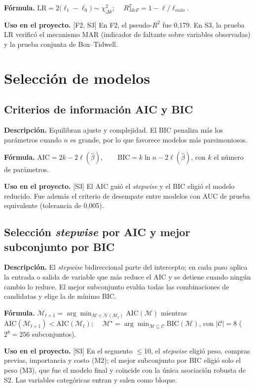 \documentclass[11pt,a4paper]{article}
\newcommand{\desc}{\textbf{Descripción.} }
\newcommand{\formula}{\textbf{Fórmula.} }
\newcommand{\uso}{\textbf{Uso en el proyecto.} }
\newcommand{\fase}[1]{{\footnotesize\color{gris}[#1]}}
\begin{document}
\formula $\mathrm{LR}=2\big(\ell_1-\ell_0\big)\sim\chi^2_{\Delta k}$; $\quad R^2_{McF}=1-\ell/\ell_{nulo}$.

\uso \fase{F2, S3} En F2, el pseudo-$R^2$ fue 0,179. En S3, la prueba LR verificó el mecanismo MAR (indicador de faltante sobre variables observadas) y la prueba conjunta de Box--Tidwell.

\section{Selección de modelos}\label{sec:seleccion}

\subsection{Criterios de información AIC y BIC}
\desc Equilibran ajuste y complejidad. El BIC penaliza más los parámetros cuando $n$ es grande, por lo que favorece modelos más parsimoniosos.

\formula $\mathrm{AIC}=2k-2\ell(\hat\beta),\qquad \mathrm{BIC}=k\ln n-2\ell(\hat\beta)$, con $k$ el número de parámetros.

\uso \fase{S3} El AIC guió el \emph{stepwise} y el BIC eligió el modelo reducido. Fue además el criterio de desempate entre modelos con AUC de prueba equivalente (tolerancia de 0,005).

\subsection{Selección \emph{stepwise} por AIC y mejor subconjunto por BIC}
\desc El \emph{stepwise} bidireccional parte del intercepto; en cada paso aplica la entrada o salida de variable que más reduce el AIC y se detiene cuando ningún cambio lo reduce. El mejor subconjunto evalúa todas las combinaciones de candidatas y elige la de mínimo BIC.

\formula $\mathcal M_{t+1}=\arg\min_{\mathcal M\in\mathcal N(\mathcal M_t)}\mathrm{AIC}(\mathcal M)$ mientras $\mathrm{AIC}(\mathcal M_{t+1})<\mathrm{AIC}(\mathcal M_t)$; $\quad\mathcal M^\star=\arg\min_{\mathcal M\subseteq\mathcal C}\mathrm{BIC}(\mathcal M)$, con $|\mathcal C|=8$ ($2^8=256$ subconjuntos).

\uso \fase{S3} En el segmento $\le10$, el \emph{stepwise} eligió peso, compras previas, importancia y costo (M2); el mejor subconjunto por BIC eligió solo el peso (M3), que fue el modelo final y coincide con la única asociación robusta de S2. Las variables categóricas entran y salen como bloque.
\end{document}
